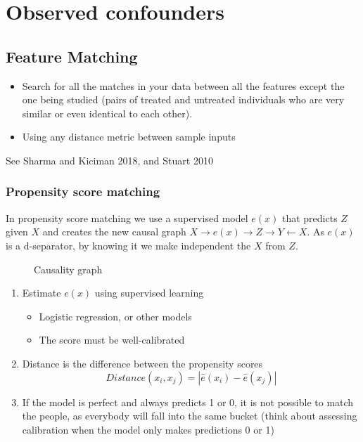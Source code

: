 \documentclass[b5paper]{report}
\begin{document}
\section{Observed confounders}

\subsection{Feature Matching}

\begin{itemize}
  \item Search for all the matches in your data between all the features except
    the one being studied (pairs of treated and untreated individuals who are
    very similar or even identical to each other).
  \item Using any distance metric between sample inputs
\end{itemize}

See Sharma and Kiciman 2018, and Stuart 2010

\subsubsection{Propensity score matching}

In propensity score matching we use a supervised model $e(x)$ that predicts $Z$
given $X$ and creates the new causal graph $X \to e(x) \to Z \to Y \leftarrow
X$. As $e(x)$ is a d-separator, by knowing it we make independent the $X$ from
$Z$.

\begin{figure}[h]
  \centering
  \caption{Causality graph}
\end{figure}

\begin{enumerate}
  \item Estimate $e(x)$ using supervised learning
    \begin{itemize}
      \item Logistic regression, or other models
      \item The score must be well-calibrated
    \end{itemize}
  \item Distance is the difference between the propensity scores
    \begin{equation}
      Distance(x_i, x_j) = |\hat{e}(x_i) - \hat{e}(x_j)|
    \end{equation}
  \item If the model is perfect and always predicts 1 or 0, it is not possible
    to match the people, as everybody will fall into the same bucket (think
    about assessing calibration when the model only makes predictions 0 or 1)
\end{enumerate}
\end{document}
